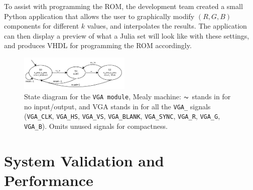 \documentclass{article}
\begin{document}
To assist with programming the ROM, the development team created a small Python application that allows the user
to graphically modify $(R, G, B)$ components for different $k$ values, and interpolates the results. The application 
can then display a preview of what a Julia set will look like with these settings, and produces VHDL for programming
the ROM accordingly.



\begin{figure}
  \centering
    \includegraphics[width=200px]{state_diagrams/vga.pdf}
  \caption{State diagram for the \texttt{VGA module}, Mealy machine: $\thicksim$
    stands in for no input/output, and VGA stands in for all the \texttt{VGA\_}
    signals (\texttt{VGA\_CLK}, \texttt{VGA\_HS}, \texttt{VGA\_VS},
    \texttt{VGA\_BLANK}, \texttt{VGA\_SYNC}, \texttt{VGA\_R}, \texttt{VGA\_G},
    \texttt{VGA\_B}). Omits unused signals for compactness.}
\end{figure}





\section{System Validation and Performance}
\end{document}
